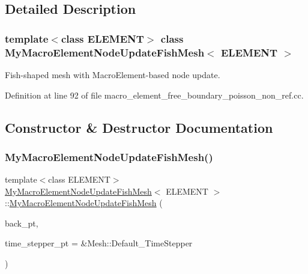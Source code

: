 \subsection{Detailed Description}
\subsubsection*{template$<$class E\+L\+E\+M\+E\+NT$>$\newline
class My\+Macro\+Element\+Node\+Update\+Fish\+Mesh$<$ E\+L\+E\+M\+E\+N\+T $>$}

Fish-\/shaped mesh with Macro\+Element-\/based node update. 

Definition at line 92 of file macro\+\_\+element\+\_\+free\+\_\+boundary\+\_\+poisson\+\_\+non\+\_\+ref.\+cc.



\subsection{Constructor \& Destructor Documentation}
\mbox{\label{classMyMacroElementNodeUpdateFishMesh_aa5f87bdc70d79e5361e5c38f6ff0f2ba}} 
\subsubsection{\texorpdfstring{My\+Macro\+Element\+Node\+Update\+Fish\+Mesh()}{MyMacroElementNodeUpdateFishMesh()}}
{\footnotesize\ttfamily template$<$class E\+L\+E\+M\+E\+NT$>$ \\
\hyperlink{classMyMacroElementNodeUpdateFishMesh}{My\+Macro\+Element\+Node\+Update\+Fish\+Mesh}$<$ E\+L\+E\+M\+E\+NT $>$\+::\hyperlink{classMyMacroElementNodeUpdateFishMesh}{My\+Macro\+Element\+Node\+Update\+Fish\+Mesh} (\begin{DoxyParamCaption}\item[{Geom\+Object $\ast$}]{back\+\_\+pt,  }\item[{Time\+Stepper $\ast$}]{time\+\_\+stepper\+\_\+pt = {\ttfamily \&Mesh\+:\+:Default\+\_\+TimeStepper} }\end{DoxyParamCaption})\hspace{0.3cm}{\ttfamily [inline]}}



